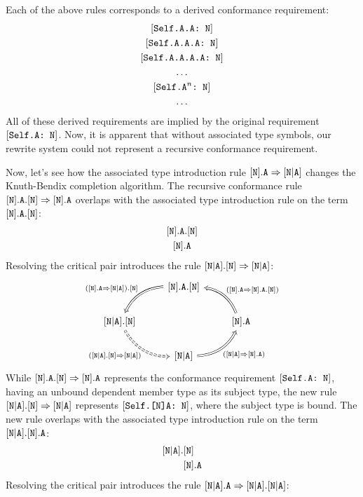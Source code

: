 \documentclass[../generics]{subfiles}
\begin{document}
Each of the above rules corresponds to a derived conformance requirement:
\begin{gather*}
\ConfReq{Self.A.A}{N}\\
\ConfReq{Self.A.A.A}{N}\\
\ConfReq{Self.A.A.A.A}{N}\\
\ldots\\
\ConfReq{Self.$\texttt{A}^n$}{N}\\
\ldots
\end{gather*}
All of these derived requirements are implied by the original requirement $[\texttt{Self.A:~N}]$. Now, it is apparent that without associated type symbols, our rewrite system could not represent a recursive conformance requirement.

Now, let's see how the associated type introduction rule $[\texttt{N}].\texttt{A}\Rightarrow[\texttt{N}|\texttt{A}]$ changes the Knuth-Bendix completion algorithm. The recursive conformance rule $[\texttt{N}].\texttt{A}.[\texttt{N}]\Rightarrow[\texttt{N}].\texttt{A}$ overlaps with the associated type introduction rule on the term $[\texttt{N}].\texttt{A}.[\texttt{N}]$:
\begin{gather*}
\protosym{N}.\texttt{A}.\protosym{N}\\
\protosym{N}.\texttt{A}
\end{gather*}
Resolving the critical pair introduces the rule $[\texttt{N}|\texttt{A}].[\texttt{N}]\Rightarrow[\texttt{N}|\texttt{A}]$:
\[
\FourLoopDerived%
{\protosym{N}.\texttt{A}.\protosym{N}}%
{\assocsym{N}{A}.\protosym{N}}%
{\assocsym{N}{A}}%
{\protosym{N}.\texttt{A}}%
{(\protosym{N}.\texttt{A}\Rightarrow\assocsym{N}{A}).\protosym{N}}%
{(\assocsym{N}{A}.\protosym{N}\Rightarrow\assocsym{N}{A})}%
{(\assocsym{N}{A}\Rightarrow\protosym{N}.\texttt{A})}%
{(\protosym{N}.\texttt{A}\Rightarrow\protosym{N}.\texttt{A}.\protosym{N})}
\]
While $[\texttt{N}].\texttt{A}.[\texttt{N}]\Rightarrow[\texttt{N}].\texttt{A}$ represents the conformance requirement $[\texttt{Self.A:~N}]$, having an unbound dependent member type as its subject type, the new rule $[\texttt{N}|\texttt{A}].[\texttt{N}]\Rightarrow[\texttt{N}|\texttt{A}]$ represents $[\texttt{Self.[N]A:~N}]$, where the subject type is bound. The new rule overlaps with the associated type introduction rule on the term $[\texttt{N}|\texttt{A}].[\texttt{N}].\texttt{A}$:
\begin{align*}
[\texttt{N}|\texttt{A}].&[\texttt{N}]\\
&[\texttt{N}].\texttt{A}
\end{align*}
Resolving the critical pair introduces the rule $[\texttt{N}|\texttt{A}].\texttt{A}\Rightarrow[\texttt{N}|\texttt{A}].[\texttt{N}|\texttt{A}]$:
\end{document}
